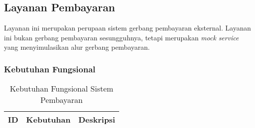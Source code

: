 \subsection{Layanan Pembayaran}

Layanan ini merupakan perupaan sistem gerbang pembayaran eksternal. Layanan ini bukan gerbang pembayaran sesungguhnya, tetapi merupakan \textit{mock service} yang menyimulasikan alur gerbang pembayaran. 

\subsubsection{Kebutuhan Fungsional}


\begingroup
\footnotesize
\begin{longtable}{|l|p{}|p{}|}
    \caption{Kebutuhan Fungsional Sistem Pembayaran}                                                                                                                                                                                                                                                                                                                                                                                                                                                                                                                                                           \\
    \hline
    \textbf{ID} & \textbf{Kebutuhan}                                                                                                                                                                                                              & \textbf{Deskripsi}                                                                                                                                                                                                                                                                                                                                    \\
    \endfirsthead


\end{longtable}
